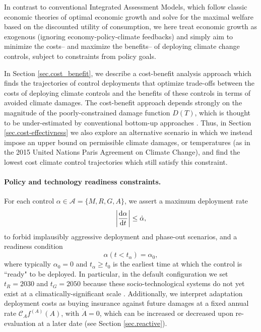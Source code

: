\documentclass{article}
\begin{document}
In contrast to conventional Integrated Assessment Models, which follow classic economic theories of optimal economic growth and solve for the maximal welfare based on the discounted utility of consumption, we here treat economic growth as exogenous (ignoring economy-policy-climate feedbacks) and simply aim to minimize the costs– and maximize the benefits– of deploying climate change controls, subject to constraints from policy goals.

In Section \ref{sec.cost_benefit}, we describe a cost-benefit analysis approach which finds the trajectories of control deployments that optimize trade-offs between the costs of deploying climate controls and the benefits of these controls in terms of avoided climate damages. The cost-benefit approach depends strongly on the magnitude of the poorly-constrained damage function $D(T)$, which is thought to be under-estimated by conventional bottom-up approaches \citep{ackerman_limitations_2009}. Thus, in Section \ref{sec.cost-effectivness} we also explore an alternative scenario in which we instead impose an upper bound on permissible climate damages, or temperatures (as in the 2015 United Nations Paris Agreement on Climate Change), and find the lowest cost climate control trajectories which still satisfy this constraint.

\paragraph{Policy and technology readiness constraints.} For each control $\alpha \in \mathcal{A} = \{ M, R, G, A\}$, we assert a maximum deployment rate
\begin{equation}
    \abs{\dv{\alpha}{t}} \le \dot{\alpha},
\end{equation}
to forbid implausibly aggressive deployment and phase-out scenarios, and a readiness condition
\begin{equation}
    \alpha(t < t_{\alpha}) = \alpha_{0},
\end{equation} where typically $\alpha_{0} = 0$ and $t_{\alpha} \ge t_{0}$ is the earliest time at which the control is ``ready" to be deployed. In particular, in the default configuration we set $t_{R} = 2030$ and $t_{G} = 2050$ because these socio-technological systems do not yet exist at a climatically-significant scale \citep{minx_negative_2018, flegal_solar_2019}. Additionally, we interpret adaptation deployment costs as buying insurance against future damages at a fixed annual rate $\mathcal{C}_{A} f^{(A)}(A)$, with $\dot{A} = 0$, which can be increased or decreased upon re-evaluation at a later date (see Section \ref{sec.reactive}).
\end{document}
